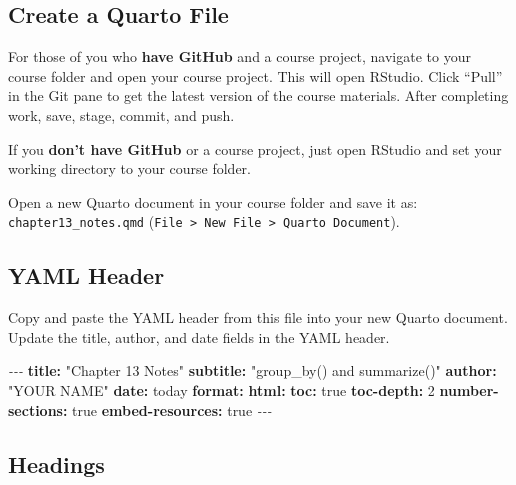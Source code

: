 \documentclass[
]{article}
\newenvironment{Shaded}{\begin{snugshade}}{\end{snugshade}}
\newcommand{\AttributeTok}[1]{\textcolor[rgb]{0.13,0.29,0.53}{#1}}
\newcommand{\CharTok}[1]{\textcolor[rgb]{0.31,0.60,0.02}{#1}}
\newcommand{\DecValTok}[1]{\textcolor[rgb]{0.00,0.00,0.81}{#1}}
\newcommand{\FunctionTok}[1]{\textcolor[rgb]{0.13,0.29,0.53}{\textbf{#1}}}
\newcommand{\KeywordTok}[1]{\textcolor[rgb]{0.13,0.29,0.53}{\textbf{#1}}}
\newcommand{\PreprocessorTok}[1]{\textcolor[rgb]{0.56,0.35,0.01}{\textit{#1}}}
\newcommand{\StringTok}[1]{\textcolor[rgb]{0.31,0.60,0.02}{#1}}
\begin{document}
\subsection{Create a Quarto File}\label{create-a-quarto-file}

For those of you who \textbf{have GitHub} and a course project, navigate
to your course folder and open your course project. This will open
RStudio. Click ``Pull'' in the Git pane to get the latest version of the
course materials. After completing work, save, stage, commit, and push.

If you \textbf{don't have GitHub} or a course project, just open RStudio
and set your working directory to your course folder.

Open a new Quarto document in your course folder and save it as:
\texttt{chapter13\_notes.qmd}
(\texttt{File\ \textgreater{}\ New\ File\ \textgreater{}\ Quarto\ Document}).

\subsection{YAML Header}\label{yaml-header}

Copy and paste the YAML header from this file into your new Quarto
document. Update the title, author, and date fields in the YAML header.

\begin{Shaded}
\begin{Highlighting}[]
\PreprocessorTok{{-}{-}{-}}
\FunctionTok{title}\KeywordTok{:}\AttributeTok{ }\StringTok{"Chapter 13 Notes"}
\FunctionTok{subtitle}\KeywordTok{:}\AttributeTok{ }\StringTok{"group\_by() and summarize()"}
\FunctionTok{author}\KeywordTok{:}\AttributeTok{ }\StringTok{"YOUR NAME"}
\FunctionTok{date}\KeywordTok{:}\AttributeTok{ today}
\FunctionTok{format}\KeywordTok{:}
\AttributeTok{  }\FunctionTok{html}\KeywordTok{:}
\AttributeTok{    }\FunctionTok{toc}\KeywordTok{:}\AttributeTok{ }\CharTok{true}
\AttributeTok{    }\FunctionTok{toc{-}depth}\KeywordTok{:}\AttributeTok{ }\DecValTok{2}
\AttributeTok{    }\FunctionTok{number{-}sections}\KeywordTok{:}\AttributeTok{ }\CharTok{true}
\AttributeTok{    }\FunctionTok{embed{-}resources}\KeywordTok{:}\AttributeTok{ }\CharTok{true}
\PreprocessorTok{{-}{-}{-}}
\end{Highlighting}
\end{Shaded}

\subsection{Headings}\label{headings}
\end{document}
